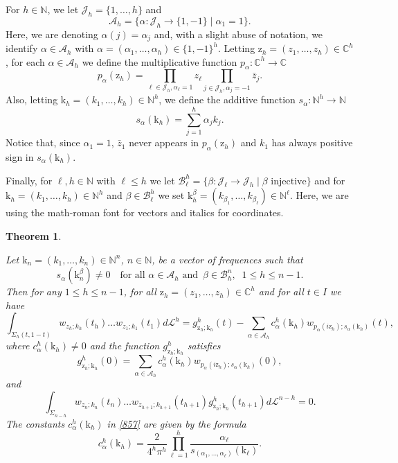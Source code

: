 \documentclass[12pt, reqno]{amsart}
\theoremstyle{plain}
\newtheorem {theorem}{Theorem}[section]
\theoremstyle{definition}
\theoremstyle{remark}
\numberwithin{equation}{section}
\newcommand{\C}{\mathbb{C}}
\newcommand{\N}{\mathbb{N}}
\renewcommand{\L}{\mathcal{L}}
\newcommand{\A}{\mathcal{A}}
\newcommand{\B}{\mathcal{B}}
\newcommand{\0}{\theta}
\renewcommand{\a}{\alpha}
\renewcommand{\b}{\beta}
\renewcommand{\k}{\kappa}
\newcommand{\z}{\zeta}
\newcommand{\1}{{-1}}
\renewcommand{\l}{\ell}
\renewcommand{\=}{\coloneqq}
\renewcommand{\.}{\dots}
\newcommand{\mc}{\mathcal}
\newcommand{\be}{\begin{equation}}
\newcommand{\ee}{\end{equation}}
\renewcommand{\A}{\mc A}
\renewcommand{\z}{\mathrm z}
\renewcommand{\k}{\mathrm k}
\newcommand{\J}{\mathcal J}
\newcommand{\nota}[1]{\marginpar{!!!!!!!!!!!}\footnote{#1}}
\begin{document}
 


For $h\in\N$, we let 
 $\J_h=\{1,\.,h\}$ and 
\[
  \A_h=\big\{\a:\J_h\to\{1,-1\}\mid \a_1=1\big\}.
\]
Here, we are denoting    $\a(j)=\a_j$ and, with a slight abuse of notation, we identify $\a\in\A_h$ with   $\a=(\a_1,\.,\a_h)\in\{1,-1\}^h$.
Letting   $\z_h=(z_1,\.,z_h)\in\C^h$, 
 for each  $\a\in\A_h$ we define the multiplicative function   $p_\a:\C^{h}\to\C$ 
\[
 p_\a(\z_h)=\prod_{\l\in\J_h, \a_\l=1}z_\l \prod_{j\in\J_h, \a_j=-1}\bar z_j.
\]
Also, letting  $\k_h=(k_1,\.,k_h)\in\N^h$, we define the additive function $s_\a:\N^h\to\N$
\[
 s_\a(\k_h)=\sum_{j=1}^h\a_jk_j.
\]
Notice that, since $\a_1=1$, $\bar z_1$ never appears  in $p_\a(\z_h)$ and $k_1$ has always positive sign in $s_\a(\k_h)$. 



Finally,  for $\l,h\in\N$ with $\l\leq h$ we let $\B_\l^h =\{\b:\J_\l\to\J_h \mid \b \textrm{ injective}\}$ and for $\k _h =(k_1,\dots,k_h)\in \N^h$
and $\b\in \B_\l^h$   we set $\k_h^\b = (k_{\b_1},\dots, k_{\b_\l})\in\N^\l$.
Here, we are using the math-roman font for vectors and   italics  for   coordinates.


\begin{theorem}
 \label{bugsbunny}
 
 Let $\k_n=(k_1,\dots,k_n) \in \N^n$, $n\in\N$,  be a vector of frequences such that 
  \be
  \label{preliminare}
  s_\a(\k_n^\beta)  \neq0 \quad \textrm{for all } \a\in\A_h\textrm{ and }\, \b\in\B_h^n,\,\,\ 1\leq  h\leq n-1.
 \ee
 Then   for any   $1\leq h \leq n-1$, for all $\z_h  =(z_1,\dots,z_h) \in\C^h$ and for all $t\in I $ we have 
  \be\label{85}
  \int_{\Sigma_h(t,1-t)}w_{z_h;k_h}(t_h) \.w_{z_1;k_1}(t_1) d\L^h=g_{\z_h;\k_h}^h(t)-\sum_{\a\in\A_h}c_\a^h (\k_h)  w_{p_\a(i\z_h);s_\a(\k_h)} (t) ,
 \ee
 where $c_\a^h (\k_h) \neq 0$ and the function $g_{\z_h;\k_h}^h$ satisfies 
  \be\label{857}
  g_{\z_h;\k_h}^h(0)=\sum_{\a\in\A_h}c_\a^h (\k_h)  w_{p_\a(i\z_h);s_\a(\k_h)} (0) ,
 \ee
 and 
  \be\label{856}
  \int_{\Sigma_{n-h}}w_{z_n;k_n}(t_n) \.w_{z_{h+1};k_{h+1}}(t_{h+1})  g_{\z_h;\k_h}^h(t_{h+1})  d\L^{n-h}=0.
  \ee
  {\color{black} The constants $c_\a^h(\k_h)$ in \eqref{857} are given by the   formula 
  \be\label{ca}
  c_\a^h(\k_h) =\frac{2}{4^h \pi^h}\prod_{\l=1}^h\frac{\a_\l}{s_{(\a_1,\.,\a_\l)}(\k_\l)}.
  \ee
}
 
            \end{theorem}
\end{document}
